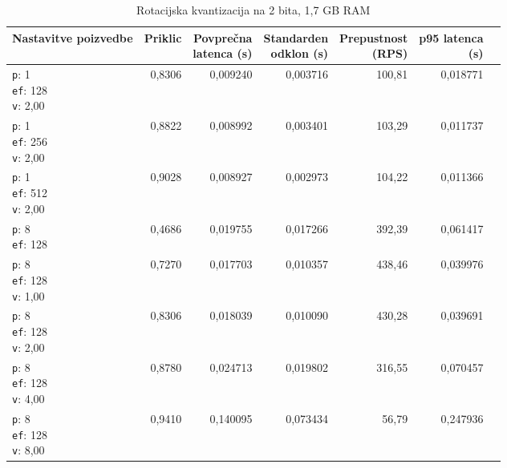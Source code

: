 \begin{table}[htbp]
  \centering
\small
  \caption{Rotacijska kvantizacija na 2 bita, 1,7 GB RAM}
  \label{tab:single-2cpu-1.7ram:tq2:qdrant-dipl-baseline-tenant-subgraph-tq2-ext-m16-ef-128-random-768-100-tenants-extended-upload-2026-08-18-15-29-12.json}
  \begin{tabularx}{\textwidth}{Xrrrrrr}
    \toprule
    Nastavitve poizvedbe & Priklic & \makecell{Povprečna\\latenca (s)} & \makecell{Standarden\\odklon (s)} & \makecell{Prepustnost\\(RPS)} & \makecell{p95 latenca\\(s)}  \\
    \midrule
    \makecell{\texttt{p}: 1\\\texttt{ef}: 128\\\texttt{v}: 2,00} & 0,8306 & 0,009240 & 0,003716 & 100,81 & 0,018771 \\
    \makecell{\texttt{p}: 1\\\texttt{ef}: 256\\\texttt{v}: 2,00} & 0,8822 & 0,008992 & 0,003401 & 103,29 & 0,011737 \\
    \makecell{\texttt{p}: 1\\\texttt{ef}: 512\\\texttt{v}: 2,00} & 0,9028 & 0,008927 & 0,002973 & 104,22 & 0,011366 \\
    \makecell{\texttt{p}: 8\\\texttt{ef}: 128} & 0,4686 & 0,019755 & 0,017266 & 392,39 & 0,061417 \\
    \makecell{\texttt{p}: 8\\\texttt{ef}: 128\\\texttt{v}: 1,00} & 0,7270 & 0,017703 & 0,010357 & 438,46 & 0,039976 \\
    \makecell{\texttt{p}: 8\\\texttt{ef}: 128\\\texttt{v}: 2,00} & 0,8306 & 0,018039 & 0,010090 & 430,28 & 0,039691 \\
    \makecell{\texttt{p}: 8\\\texttt{ef}: 128\\\texttt{v}: 4,00} & 0,8780 & 0,024713 & 0,019802 & 316,55 & 0,070457 \\
    \makecell{\texttt{p}: 8\\\texttt{ef}: 128\\\texttt{v}: 8,00} & 0,9410 & 0,140095 & 0,073434 & 56,79 & 0,247936 \\

\end{tabularx}
\end{table}

